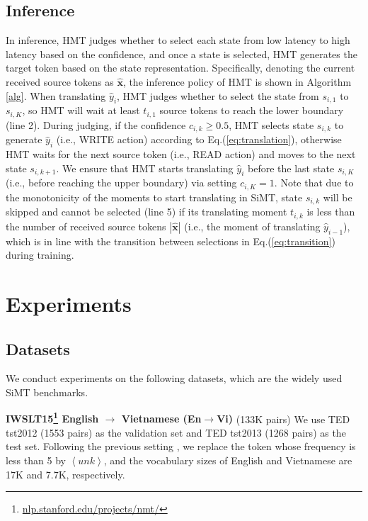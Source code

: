 \documentclass{article} %
\begin{document}
\subsection{Inference}
\label{sec:inference}

In inference, HMT judges whether to select each state from low latency to high latency based on the confidence, and once a state is selected, HMT generates the target token based on the state representation. Specifically, denoting the current received source tokens as $\hat{\mathbf{x}}$, the inference policy of HMT is shown in Algorithm \ref{alg}.
When translating $\hat{y}_{i}$, HMT judges whether to select the state from $s_{i,1}$ to $s_{i,K}$, so HMT will wait at least $t_{i,1}$ source tokens to reach the lower boundary (line 2). During judging, if the confidence $c_{i,k}\!\geq\!0.5$, HMT selects state $s_{i,k}$ to generate $\hat{y}_{i}$ (i.e., WRITE action) according to Eq.(\ref{eq:translation}), otherwise HMT waits for the next source token (i.e., READ action) and moves to the next state $s_{i,k+1}$. We ensure that HMT starts translating $\hat{y}_{i}$ before the last state $s_{i,K}$ (i.e., before reaching the upper boundary) via setting $c_{i,K}\!=\!1$. Note that due to the monotonicity of the moments to start translating in SiMT, state $s_{i,k}$ will be skipped and cannot be selected (line 5) if its translating moment $t_{i,k}$ is less than the number of received source tokens $\left| \hat{\mathbf{x}} \right|$ (i.e., the moment of translating $\hat{y}_{i-1}$), which is in line with the transition between selections in Eq.(\ref{eq:transition}) during training.

\section{Experiments}

\subsection{Datasets}

We conduct experiments on the following datasets, which are the widely used SiMT benchmarks.

\textbf{IWSLT15\footnote{\url{nlp.stanford.edu/projects/nmt/}} English $\!\rightarrow \!$ Vietnamese (En$\rightarrow$Vi)} (133K pairs) We use TED tst2012 (1553 pairs) as the validation set and TED tst2013 (1268 pairs) as the test set. Following the previous setting \citep{Ma2019a,zhang-feng-2021-universal}, we replace the token whose frequency is less than 5 by $\left \langle unk \right \rangle$, and the vocabulary sizes of English and Vietnamese are 17K and 7.7K, respectively.
\end{document}
